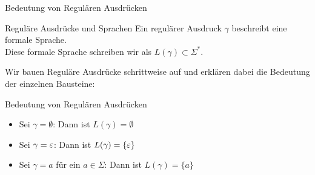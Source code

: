 \begin{frame}{Bedeutung von Regulären Ausdrücken}
    \begin{block}{Reguläre Ausdrücke und Sprachen}
        Ein regulärer Ausdruck $\gamma$ beschreibt eine formale Sprache.\\
        Diese formale Sprache schreiben wir als $L(\gamma) \subset \Sigma^*$.
    \end{block}
    Wir bauen Reguläre Ausdrücke schrittweise auf und erklären dabei die Bedeutung der einzelnen Bausteine:
    \begin{block}{Bedeutung von Regulären Ausdrücken}
        \begin{itemize}[<+- | alert@+>]
            \item Sei $\gamma = \emptyset$: Dann ist $L(\gamma) = \emptyset$
            \item Sei $\gamma = \varepsilon$: Dann ist $L(\gamma) = \{\varepsilon\}$
            \item Sei $\gamma = a$ für ein $a \in \Sigma$: Dann ist $L(\gamma) = \{a\}$
        \end{itemize}
    \end{block}
\end{frame}

